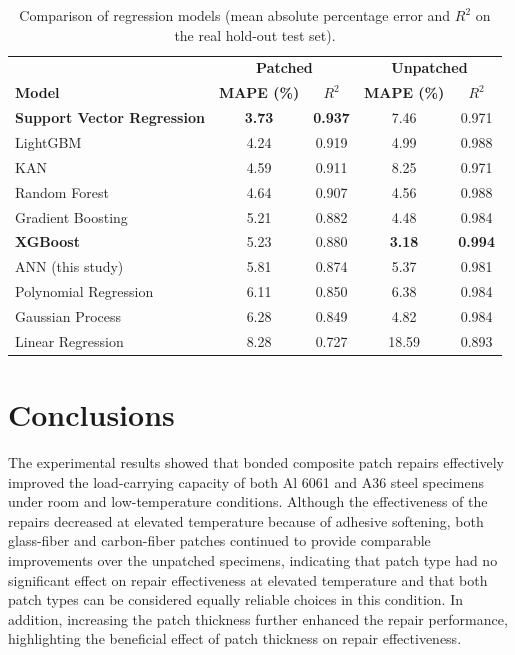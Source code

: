 \documentclass[journal,article,submit,pdftex,moreauthors]{Definitions/mdpi}
\begin{document}
\begin{table}[H]
\centering
\caption{Comparison of regression models (mean absolute percentage error and $R^2$ on the real hold-out test set).}
\label{tab:model_comparison}
\begin{tabular}{lcccc}
\toprule
 & \multicolumn{2}{c}{\textbf{Patched}} & \multicolumn{2}{c}{\textbf{Unpatched}} \\
\textbf{Model} & \textbf{MAPE (\%)} & \textbf{$R^2$} & \textbf{MAPE (\%)} & \textbf{$R^2$} \\
\midrule
\textbf{Support Vector Regression} & \textbf{3.73} & \textbf{0.937} & 7.46  & 0.971 \\
LightGBM                  & 4.24 & 0.919 & 4.99  & 0.988 \\
KAN                       & 4.59 & 0.911 & 8.25  & 0.971 \\
Random Forest             & 4.64 & 0.907 & 4.56  & 0.988 \\
Gradient Boosting         & 5.21 & 0.882 & 4.48  & 0.984 \\
\textbf{XGBoost}            & 5.23 & 0.880 & \textbf{3.18}  & \textbf{0.994} \\
ANN (this study)          & 5.81 & 0.874 & 5.37  & 0.981 \\
Polynomial Regression     & 6.11 & 0.850 & 6.38  & 0.984 \\
Gaussian Process          & 6.28 & 0.849 & 4.82  & 0.984 \\
Linear Regression         & 8.28 & 0.727 & 18.59 & 0.893 \\
\bottomrule
\end{tabular}
\end{table}





\section{Conclusions}\label{sec:conclusion}

The experimental results showed that bonded composite patch repairs effectively improved the load-carrying capacity of both Al 6061 and A36 steel specimens under room and low-temperature conditions. Although the effectiveness of the repairs decreased at elevated temperature because of adhesive softening, both glass-fiber and carbon-fiber patches continued to provide comparable improvements over the unpatched specimens, indicating that patch type had no significant effect on repair effectiveness at elevated temperature and that both patch types can be considered equally reliable choices in this condition. In addition, increasing the patch thickness further enhanced the repair performance, highlighting the beneficial effect of patch thickness on repair effectiveness.
\end{document}
